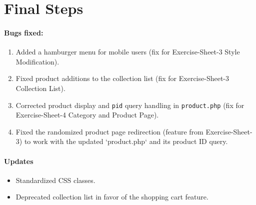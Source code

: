 \section{Final Steps}

\paragraph{Bugs fixed:}
\begin{enumerate}
    \item Added a hamburger menu for mobile users (fix for Exercise-Sheet-3 Style Modification).
    \item Fixed product additions to the collection list (fix for Exercise-Sheet-3 Collection List).
    \item Corrected product display and \texttt{pid} query handling in \texttt{product.php} (fix for Exercise-Sheet-4 Category and Product Page).
    \item Fixed the randomized product page redirection (feature from Exercise-Sheet-3) to work with the updated `product.php` and its product ID query.
\end{enumerate}

\paragraph{Updates}
\begin{itemize}
    \item Standardized CSS classes.
    \item Deprecated collection list in favor of the shopping cart feature.
\end{itemize}